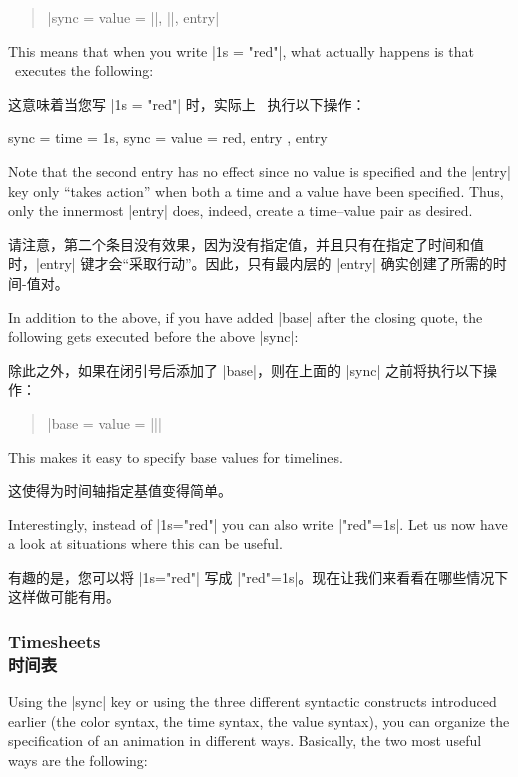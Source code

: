 \begin{quote}
    \normalfont
    |sync = {value = ||, ||, entry}|
\end{quote}

This means that when you write |1s = "red"|, what actually happens is that
\tikzname\ executes the following:

这意味着当您写 |1s = "red"| 时，实际上 \tikzname\ 执行以下操作：


\begin{codeexample}
sync = { time = 1s, sync = { value = red, entry }, entry }
\end{codeexample}
%
Note that the second entry has no effect since no value is specified and the
|entry| key only ``takes action'' when both a time and a value have been
specified. Thus, only the innermost |entry| does, indeed, create a time--value
pair as desired.

请注意，第二个条目没有效果，因为没有指定值，并且只有在指定了时间和值时，|entry| 键才会“采取行动”。因此，只有最内层的 |entry| 确实创建了所需的时间-值对。

In addition to the above, if you have added |base| after the closing quote, the
following gets executed before the above |sync|:

除此之外，如果在闭引号后添加了 |base|，则在上面的 |sync| 之前将执行以下操作：

%
\begin{quote}
    \normalfont
    |base = {value = ||}|
\end{quote}

This makes it easy to specify base values for timelines.

这使得为时间轴指定基值变得简单。

Interestingly, instead of |1s="red"| you can also write |"red"=1s|. Let us now
have a look at situations where this can be useful.

有趣的是，您可以将 |1s="red"| 写成 |"red"=1s|。现在让我们来看看在哪些情况下这样做可能有用。


\subsubsection{Timesheets\\时间表}

Using the |sync| key or using the three different syntactic constructs
introduced earlier (the color syntax, the time syntax, the value syntax), you
can organize the specification of an animation in different ways. Basically,
the two most useful ways are the following:

